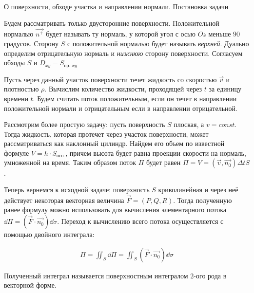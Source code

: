 
\begin{remark}
  О поверхности, обходе участка и направлении нормали. Постановка задачи

  \begin{multicols}{2}
    
    \columnbreak

    Будем рассматривать только двусторонние поверхности. Положительной
    нормалью \(\vec{n^{+}}\) будет называть ту нормаль, у которой угол с осью
    \(Oz\) меньше \(90\) градусов. Сторону \(S\) с положительной нормалью
    будет называть \textit{верхней}. Дуально определим отрицательную нормаль и
    \textit{нижнюю} сторону поверхности. Согласуем обходы \(S\) и
    \(D_{xy} = S_{\text{пр. }xy}\)

    Пусть через данный участок поверхности течет жидкость со скоростью
    \(\vec{v}\) и плотностью \(\rho\). Вычислим количество жидкости, проходящей
    через \(t\) за единицу времени \(t\). Будем считать поток положительным,
    если он течет в направлении положительной нормали и отрицательным если в 
    направлении отрицательной.

    \vfill\null
  \end{multicols}
\end{remark}

Рассмотрим более простую задачу: пусть поверхность \(S\) плоская, а
\(v = const\). Тогда жидкость, которая протечет через участок поверхности, может
рассматриваться как наклонный цилиндр. Найдем его объем по известной формуле
\(V = h \cdot S_{\text{осн.}}\), причем высота будет равна проекции скорости на
нормаль, умноженной на время. Таким образом поток \(\Pi\) будет равен
\(\Pi = V = (\vec{v}, \vec{n_{0}}) \Delta t S\).

Теперь вернемся к исходной задаче: поверхность \(S\) криволинейная и через неё
действует некоторая векторная величина \(\vec{F} = (P, Q, R)\). Тогда полученную
ранее формулу можно использовать для вычисления элементарного потока
\(\dd \Pi = (\vec{F} \cdot \vec{n_{0}}) \dd \sigma\). Переход к вычислению всего
потока осуществляется с помощью двойного интеграла:

\begin{align*}\label{eq:surf-int-vec}\tag{SIV}
  \Pi
  = \iint_{S} \dd \Pi
  = \iint_{S} \left( \vec{F} \cdot \vec{n_{0}} \right) \dd \sigma 
\end{align*}

Полученный интеграл называется поверхностным интегралом 2-ого рода в векторной
форме.

